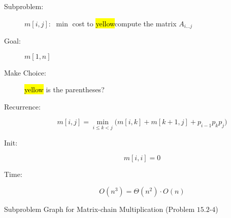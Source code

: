 
\begin{frame}{}
  \centerline{\LARGE {}}

  \vspace{0.50cm}
\end{frame}

\begin{frame}{}
  \begin{description}
    \item[Subproblem:] $m[i,j]:$ $\min$ cost to \hl{yellow}{compute the matrix $A_{i \dots j}$}
    \item[Goal:] $m[1,n]$
      \pause
      \vspace{0.30cm}
    \item[Make Choice:] \hl{yellow}{ is the {\it {}} parentheses?}
    \item[Recurrence:] 
      \[
	m[i,j] = \min_{i \le k <j} \Big(m[i,k] + m[k+1,j] + p_{i-1}p_{k}p_{j}\Big)
      \]
      \pause
    \item[Init:]
      \[
	m[i,i] = 0
      \]
      \pause
    \item[Time:] 
      \[
	O(n^3) = \Theta(n^2) \cdot O(n)
      \]
  \end{description}
\end{frame}

\begin{frame}{}
  \begin{exampleblock}{Subproblem Graph for Matrix-chain Multiplication (Problem $15.2$-$4$)}
  \end{exampleblock}
\end{frame}
